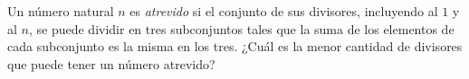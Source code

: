 Un número natural $n$ es \emph{atrevido} si el conjunto de sus divisores, incluyendo al $1$ y al $n$, se puede dividir en tres subconjuntos tales que la suma de los elementos de cada subconjunto es la misma en los tres. ¿Cuál es la menor cantidad de divisores que puede tener un número atrevido?
